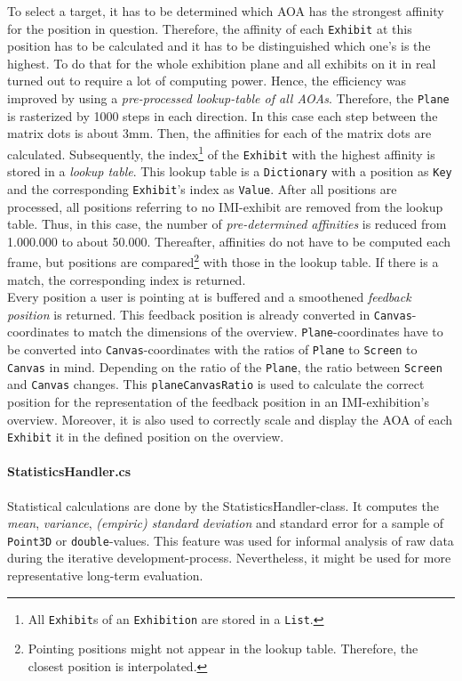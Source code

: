 To select a target, it has to be determined which \ac{AOA} has the strongest affinity for the position in question. Therefore, the affinity of each \texttt{Exhibit} at this position has to be calculated and it has to be distinguished which one's is the highest. To do that for the whole exhibition plane and all exhibits on it in real turned out to require a lot of computing power. Hence, the efficiency was improved by using a \textit{pre-processed lookup-table of all \ac{AOA}s}. Therefore, the \texttt{Plane} is rasterized by 1000 steps in each direction. In this case each step between the matrix dots is about 3mm. Then, the affinities for each of the matrix dots are calculated. Subsequently, the index\footnote{All \texttt{Exhibit}s of an \texttt{Exhibition} are stored in a \texttt{List}.} of the \texttt{Exhibit} with the highest affinity is stored in a \textit{lookup table}. This lookup table is a \texttt{Dictionary} with a position as \texttt{Key} and the corresponding \texttt{Exhibit}'s index as \texttt{Value}. After all positions are processed, all positions referring to no \ac{IMI}-exhibit are removed from the lookup table. Thus, in this case, the number of \textit{pre-determined affinities} is reduced from 1.000.000 to about 50.000. Thereafter, affinities do not have to be computed each frame, but positions are compared\footnote{Pointing positions might not appear in the lookup table. Therefore, the closest position is interpolated.} with those in the lookup table. If there is a match, the corresponding index is returned.
\\
Every position a user is pointing at is buffered and a smoothened \textit{feedback position} is returned. This feedback position is already converted in \texttt{Canvas}-coordinates to match the dimensions of the overview. \texttt{Plane}-coordinates have to be converted into \texttt{Canvas}-coordinates with the ratios of \texttt{Plane} to \texttt{Screen} to \texttt{Canvas} in mind. Depending on the ratio of the \texttt{Plane}, the ratio between \texttt{Screen} and \texttt{Canvas} changes. This \texttt{planeCanvasRatio} is used to calculate the correct position for the representation of the feedback position in an \ac{IMI}-exhibition's overview. Moreover, it is also used to correctly scale and display the \ac{AOA} of each \texttt{Exhibit} it in the defined position on the overview.


\paragraph{StatisticsHandler.cs} Statistical calculations are done by the StatisticsHandler-class. It computes the \textit{mean}, \textit{variance}, \textit{(empiric) standard deviation} and standard error for a sample of \texttt{Point3D} or \texttt{double}-values. This feature was used for informal analysis of raw data during the iterative development-process. Nevertheless, it might be used for more representative long-term evaluation. 

